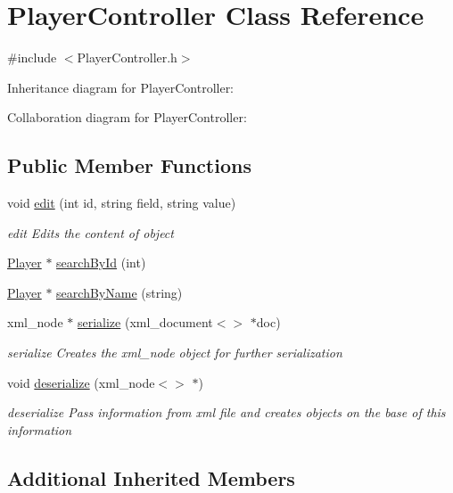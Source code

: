 \hypertarget{class_player_controller}{\section{Player\-Controller Class Reference}
\label{class_player_controller}
}


{\ttfamily \#include $<$Player\-Controller.\-h$>$}



Inheritance diagram for Player\-Controller\-:


Collaboration diagram for Player\-Controller\-:
\subsection*{Public Member Functions}
\begin{DoxyCompactItemize}
\item 
void \hyperlink{class_player_controller_aa31049f0ac0ef1a38b1334b01e3217a0}{edit} (int id, string field, string value)
\begin{DoxyCompactList}\small\item\em edit Edits the content of object \end{DoxyCompactList}\item 
\hyperlink{class_player}{Player} $\ast$ \hyperlink{class_player_controller_a6fddbc651a2a7fba34dea0e5a609444b}{search\-By\-Id} (int)
\item 
\hyperlink{class_player}{Player} $\ast$ \hyperlink{class_player_controller_a06a3cea40d352a4f8f4ec71b2dc04469}{search\-By\-Name} (string)
\item 
xml\-\_\-node $\ast$ \hyperlink{class_player_controller_acce83d1acdc1eec82210954e4d7a5322}{serialize} (xml\-\_\-document$<$$>$ $\ast$doc)
\begin{DoxyCompactList}\small\item\em serialize Creates the xml\-\_\-node object for further serialization \end{DoxyCompactList}\item 
void \hyperlink{class_player_controller_a93cec52c22ee44ed3ac8c9c8bbd96b02}{deserialize} (xml\-\_\-node$<$$>$ $\ast$)
\begin{DoxyCompactList}\small\item\em deserialize Pass information from xml file and creates objects on the base of this information \end{DoxyCompactList}\end{DoxyCompactItemize}
\subsection*{Additional Inherited Members}



